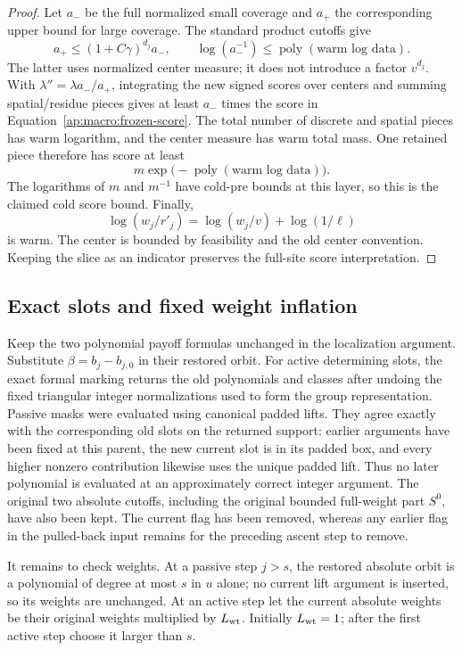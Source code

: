 \begin{proof}
Let $a_-$ be the full normalized small coverage and $a_+$ the
corresponding upper bound for large coverage.  The standard product
cutoffs give
\[
 a_+\le(1+C\gamma)^{d_j}a_-,\qquad
                  \log(a_-^{-1})\le
                     \operatorname{poly}(\text{warm log data}).
\]
The latter uses normalized center measure; it does not introduce a
factor $v^{d_j}$.  With $\lambda''=\lambda a_-/a_+$, integrating
the new signed scores over centers and summing spatial/residue pieces
gives at least $a_-$ times the score in
Equation~\eqref{ap:macro:frozen-score}.  The total number of discrete
and spatial pieces has warm logarithm, and the center measure has
warm total mass.  One retained piece therefore has score at least
\[
                    m\exp\bigl(-\operatorname{poly}
                                      (\text{warm log data})\bigr).
\]
The logarithms of $m$ and $m^{-1}$ have cold-pre bounds at this layer,
so this is the claimed cold score bound.  Finally,
\[
       \log(w_j/r'_j)=\log(w_j/v)+\log(1/\ell)
\]
is warm.  The center is bounded by feasibility and the old center
convention.  Keeping the slice as an indicator preserves the
full-site score interpretation.
\end{proof}

\subsection{Exact slots and fixed weight inflation}

Keep the two polynomial payoff formulas unchanged in the localization
argument.  Substitute $\beta=b_j-b_{j,0}$ in their restored orbit.
For active determining slots, the exact formal marking returns the
old polynomials and classes after undoing the fixed triangular integer
normalizations used to form the group representation.  Passive masks
were evaluated using canonical padded lifts.  They agree exactly
with the corresponding old slots on the returned support: earlier
arguments have been fixed at this parent, the new current slot is in
its padded box, and every higher nonzero contribution likewise uses
the unique padded lift.  Thus no later polynomial is evaluated at an
approximately correct integer argument.  The original two absolute
cutoffs, including the original bounded full-weight part $S^0$, have
also been kept.  The current flag has been removed, whereas any
earlier flag in the pulled-back input remains for the preceding
ascent step to remove.

It remains to check weights.  At a passive step $j>s$, the restored
absolute orbit is a polynomial of degree at most $s$ in $u$ alone;
no current lift argument is inserted, so its weights are unchanged.
At an active step let the current absolute weights be their original
weights multiplied by $L_{\rm wt}$.  Initially $L_{\rm wt}=1$; after
the first active step choose it larger than $s$.

